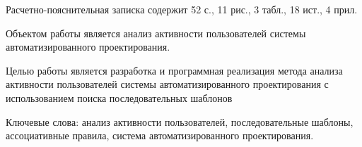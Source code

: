 
Расчетно-пояснительная записка содержит 52 с., 11 рис., 3 табл., 18 ист., 4 прил.

Объектом работы является анализ активности пользователей системы автоматизированного проектирования.

Целью работы является разработка и программная реализация метода анализа активности пользователей системы автоматизированного проектирования с использованием поиска последовательных шаблонов

Ключевые слова: анализ активности пользователей, последовательные шаблоны, ассоциативные правила, система автоматизированного проектирования.



%

